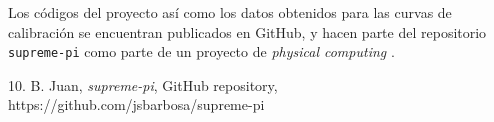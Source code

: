\documentclass{wileysix}
\begin{document}
\vfill
Los c\'odigos del proyecto as\'i como los datos obtenidos para las curvas de calibraci\'on se encuentran publicados en GitHub, y hacen parte del repositorio \verb|supreme-pi| como parte de un proyecto de \textit{physical computing} \cite{GitHub}.
\begin{chapreferences}{10.}
	B. Juan, \textit{supreme-pi}, GitHub repository,
	https://github.com/jsbarbosa/supreme-pi
\end{chapreferences}
\end{document}
